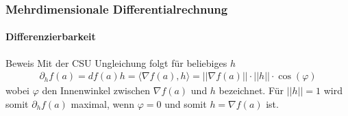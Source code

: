 \documentclass{beamer}
\begin{document}
\begin{frame}
    \frametitle{Mehrdimensionale Differentialrechnung}
\framesubtitle{Differenzierbarkeit}
    \begin{block}{Beweis}
Mit der CSU Ungleichung folgt für beliebiges $h$ 
\begin{align*}
\partial_h f(a) = df(a) h = \langle \nabla f(a) , h \rangle = || \nabla f(a)||  \cdot ||h|| \cdot \cos(\varphi) 
\end{align*} 
wobei $\varphi$ den Innenwinkel zwischen $\nabla f(a)$ und $h$ bezeichnet. Für $||h|| = 1$ wird somit $\partial_h f(a) $ maximal, wenn $\varphi = 0$ und somit $h =  \nabla f(a)$ ist.
\end{block}

 \end{frame}
\end{document}
